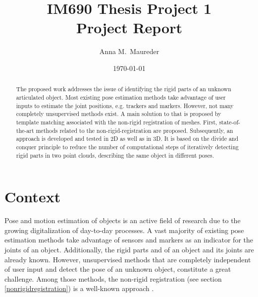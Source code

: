 \documentclass[notitlepage,english]{hgbreport}
\author{Anna M.\ Maureder}
\title{IM690 Thesis Project 1\\ %
	Project Report}	%
\date{\today}
\begin{document}
	
	\maketitle
	
	\begin{abstract}\noindent
		The proposed work addresses the issue of identifying the rigid parts of an unknown articulated object. Most existing pose estimation methods take advantage of user inputs to estimate the joint positions, e.g. trackers and markers. However, not many completely unsupervised methods exist. A main solution to that is proposed by template matching associated with the non-rigid registration of meshes. First, state-of-the-art methods related to the non-rigid-registration are proposed.  Subsequently, an approach is developed and tested in 2D as well as in 3D. It is based on the divide and conquer principle to reduce the number of computational steps of iteratively detecting rigid parts in two point clouds, describing the same object in different poses.
	\end{abstract}
	
	
	\tableofcontents

	\chapter{Context}
	
	Pose and motion estimation of objects is an active field of research due to the growing digitalization of day-to-day processes. A vast majority of existing pose estimation methods take advantage of sensors and markers as an indicator for the joints of an object. Additionally, the rigid parts and of an object and its joints are already known. However, unsupervised methods that are completely independent of user input and detect the pose of an unknown object, constitute a great challenge. Among those methods, the non-rigid registration (see section \ref{nonrigidregistration}) is a well-known approach \cite{survey}.
\end{document}
